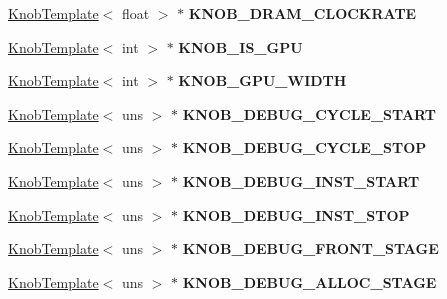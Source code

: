 \begin{DoxyCompactItemize}
\item 
\hypertarget{classall__knobs__c_a8a24331a7fc5df0bc35f9ea541619cf5}{
\hyperlink{classKnobTemplate}{KnobTemplate}$<$ float $>$ $\ast$ {\bfseries KNOB\_\-DRAM\_\-CLOCKRATE}}
\label{classall__knobs__c_a8a24331a7fc5df0bc35f9ea541619cf5}

\item 
\hypertarget{classall__knobs__c_a0fafbb5302777ba4ddf3554a6ffb374f}{
\hyperlink{classKnobTemplate}{KnobTemplate}$<$ int $>$ $\ast$ {\bfseries KNOB\_\-IS\_\-GPU}}
\label{classall__knobs__c_a0fafbb5302777ba4ddf3554a6ffb374f}

\item 
\hypertarget{classall__knobs__c_a1ad2b96187daab4abf5e23394e9d74e4}{
\hyperlink{classKnobTemplate}{KnobTemplate}$<$ int $>$ $\ast$ {\bfseries KNOB\_\-GPU\_\-WIDTH}}
\label{classall__knobs__c_a1ad2b96187daab4abf5e23394e9d74e4}

\item 
\hypertarget{classall__knobs__c_ac85e01d2619d209aba2d155d1560ee5d}{
\hyperlink{classKnobTemplate}{KnobTemplate}$<$ uns $>$ $\ast$ {\bfseries KNOB\_\-DEBUG\_\-CYCLE\_\-START}}
\label{classall__knobs__c_ac85e01d2619d209aba2d155d1560ee5d}

\item 
\hypertarget{classall__knobs__c_ad4c6b0817e3d8242ba1630b3bd19f45d}{
\hyperlink{classKnobTemplate}{KnobTemplate}$<$ uns $>$ $\ast$ {\bfseries KNOB\_\-DEBUG\_\-CYCLE\_\-STOP}}
\label{classall__knobs__c_ad4c6b0817e3d8242ba1630b3bd19f45d}

\item 
\hypertarget{classall__knobs__c_a6c065c91e2cc9a0a3f2008b13adcf70f}{
\hyperlink{classKnobTemplate}{KnobTemplate}$<$ uns $>$ $\ast$ {\bfseries KNOB\_\-DEBUG\_\-INST\_\-START}}
\label{classall__knobs__c_a6c065c91e2cc9a0a3f2008b13adcf70f}

\item 
\hypertarget{classall__knobs__c_a7138b21f53bf1ae89c515533d12b641e}{
\hyperlink{classKnobTemplate}{KnobTemplate}$<$ uns $>$ $\ast$ {\bfseries KNOB\_\-DEBUG\_\-INST\_\-STOP}}
\label{classall__knobs__c_a7138b21f53bf1ae89c515533d12b641e}

\item 
\hypertarget{classall__knobs__c_a12b627cbc7ee4744d2b203d91227a4c4}{
\hyperlink{classKnobTemplate}{KnobTemplate}$<$ uns $>$ $\ast$ {\bfseries KNOB\_\-DEBUG\_\-FRONT\_\-STAGE}}
\label{classall__knobs__c_a12b627cbc7ee4744d2b203d91227a4c4}

\item 
\hypertarget{classall__knobs__c_aacc06174d2a308c17b598986c8c58cf2}{
\hyperlink{classKnobTemplate}{KnobTemplate}$<$ uns $>$ $\ast$ {\bfseries KNOB\_\-DEBUG\_\-ALLOC\_\-STAGE}}
\label{classall__knobs__c_aacc06174d2a308c17b598986c8c58cf2}


\end{DoxyCompactItemize}
